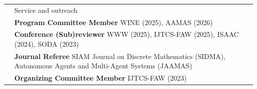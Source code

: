 \documentclass[letterpaper, 11pt]{article}
\newcommand{\headingfont}{\Large\color{OliveGreen}}
\newenvironment{SectionTable}[1]{
	\renewcommand*{\arraystretch}{1.2}
	\setlength{\tabcolsep}{8pt}
	\begin{longtable}{Rp{6.2in}} & #1 \\}
{\end{longtable}\vspace{-.7cm}}
\begin{document}





\begin{SectionTable}{\headingfont Service and outreach}
&
\textbf{Program Committee Member} \newline
WINE (2025), AAMAS (2026) \\

&
\textbf{Conference (Sub)reviewer} \newline
WWW (2025), IJTCS-FAW (2025), ISAAC (2024), SODA (2023)\\

&
\textbf{Journal Referee} \newline
SIAM Journal on Discrete Mathematics (SIDMA), Autonomous Agents and Multi-Agent Systems (JAAMAS)\\

&
\textbf{Organizing Committee Member} \newline
IJTCS-FAW (2023)\\
\end{SectionTable}

\end{document}
